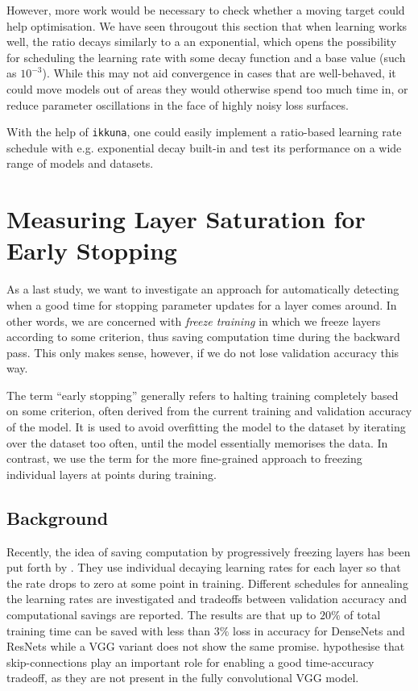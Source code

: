 However, more work would be necessary to check whether a moving target could
help optimisation. We have seen througout this section that  when learning works
well, the ratio decays similarly to a an exponential, which opens the
possibility for scheduling the learning rate with some decay function and a base
value (such as $10^{-3}$).  While this may not aid convergence in cases that are
well-behaved, it could move models out of areas they would otherwise spend too
much time in, or reduce parameter oscillations in the face of highly noisy loss
surfaces.

With the help of \texttt{ikkuna}, one could easily implement a ratio-based
learning rate schedule with e.g. exponential decay built-in and test its
performance on a wide range of models and datasets.

\section{Measuring Layer Saturation for Early Stopping}%
\label{sec:detecting_layer_saturation}

As a last study, we want to investigate an approach for automatically detecting
when a good time for stopping parameter updates for a layer comes around. In
other words, we are concerned with \emph{freeze training} in which we freeze
layers according to some criterion, thus saving computation time during the
backward pass. This only makes sense, however, if we do not lose validation
accuracy this way.

The term ``early stopping'' generally refers to halting training completely
based on some criterion, often derived from the current training and validation
accuracy of the model. It is used to avoid overfitting the model to the dataset
by iterating over the dataset too often, until the model essentially memorises
the data. In contrast, we use the term for the more fine-grained approach to
freezing individual layers at points during training.

\subsection{Background}%
\label{sub:saturation-background}

Recently, the idea of saving computation by progressively freezing layers has
been put forth by \citet{brock2017freezeout}. They use individual decaying
learning rates for each layer so that the rate drops to zero at some point in
training. Different schedules for annealing the learning rates are investigated
and tradeoffs between validation accuracy and computational savings are
reported. The results are that up to $20\%$ of total training time can be saved
with less than $3\%$ loss in accuracy for DenseNets \citep{huang2017densely} and
ResNets \citep{he2016deep} while a VGG variant does not show the same promise.
\citeauthor{brock2017freezeout} hypothesise that skip-connections play an
important role for enabling a good time-accuracy tradeoff, as they are not
present in the fully convolutional VGG model.

